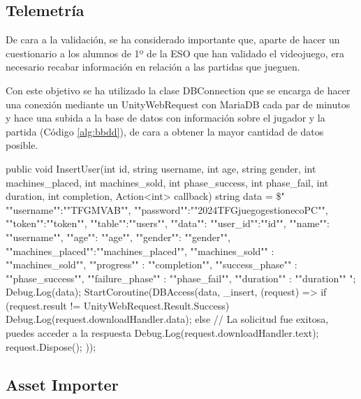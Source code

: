 \subsection{Telemetría}

De cara a la validación, se ha considerado importante que, aparte de hacer un cuestionario a los alumnos de 1º de la ESO que han validado el videojuego, era necesario recabar información en relación a las partidas que jueguen. 

Con este objetivo se ha utilizado la clase DBConnection que se encarga de hacer una conexión mediante un UnityWebRequest con MariaDB cada par de minutos y hace una subida a la base de datos con información sobre el jugador y la partida (Código \ref{alg:bbdd}), de cara a obtener la mayor cantidad de datos posible.
\begin{mypython}[caption={Código para hacer inserciones en la BBBDD.},label={alg:bbdd}]
public void InsertUser(int id, string username, int age, 
    string gender, int machines_placed, int machines_sold, 
    int phase_success, int phase_fail, int duration, 
    int completion, Action<int> callback)
{
    string data = \$\@"{{
                    ""username"":""TFGMVAB"", 
                    ""password"":""2024TFGjuegogestionecoPC"", 
                    ""token"":""{token}"",
                    ""table"":""users"",
                    ""data"": {
                     {""user_id"":""{id}"",
                     ""name"": ""{username}"",
                     ""age"": ""{age}"",
                     ""gender"": ""{gender}"",
                     ""machines_placed"":""{machines_placed}"",
                     ""machines_sold"" : ""{machines_sold}"",
                     ""progress"" : ""{completion}"",
                     ""success_phase"" : ""{phase_success}"",
                     ""failure_phase"" : ""{phase_fail}"",
                     ""duration"" : ""{duration}""}}
    }}";
    Debug.Log(data);
    StartCoroutine(DBAccess(data, _insert, (request) =>
    {
        if (request.result != UnityWebRequest.Result.Success)
        {
            Debug.Log(request.downloadHandler.data);
        }
        else
        {
            // La solicitud fue exitosa, puedes acceder a la respuesta
            Debug.Log(request.downloadHandler.text);
        }
        request.Dispose();
    }));
}
\end{mypython}

\subsection{Asset Importer}

